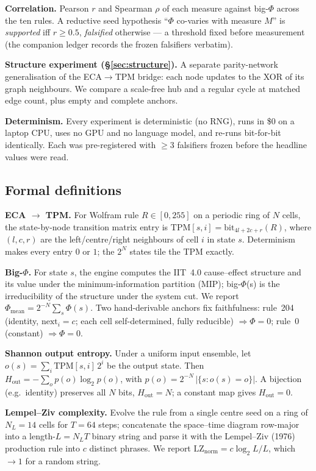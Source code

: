 \documentclass[11pt,a4paper]{article}
\newcommand{\bigphi}{\ensuremath{\Phi}}
\begin{document}
\textbf{Correlation.} Pearson \(r\) and Spearman \(\rho\) of each measure
against big-\bigphi{} across the ten rules. A reductive seed hypothesis
``\bigphi{} co-varies with measure \(M\)'' is \emph{supported} iff
\(r\ge0.5\), \emph{falsified} otherwise --- a threshold fixed before
measurement (the companion ledger records the frozen falsifiers verbatim).

\textbf{Structure experiment (\S\ref{sec:structure}).} A separate
parity-network generalisation of the ECA$\to$TPM bridge: each node
updates to the XOR of its graph neighbours. We compare a scale-free hub
and a regular cycle at matched edge count, plus empty and complete
anchors.

\textbf{Determinism.} Every experiment is deterministic (no RNG), runs in
\$0 on a laptop CPU, uses no GPU and no language model, and re-runs
bit-for-bit identically. Each was pre-registered with \(\ge3\) falsifiers
frozen before the headline values were read.

\subsection{Formal definitions}
\label{sec:formal}

\textbf{ECA \(\to\) TPM.} For Wolfram rule \(R\in[0,255]\) on a periodic
ring of \(N\) cells, the state-by-node transition matrix entry is
\(\mathrm{TPM}[s,i]=\mathrm{bit}_{4l+2c+r}(R)\), where \((l,c,r)\) are the
left/centre/right neighbours of cell \(i\) in state \(s\). Determinism
makes every entry \(0\) or \(1\); the \(2^N\) states tile the TPM exactly.

\textbf{Big-\bigphi{}.} For state \(s\), the engine computes the IIT~4.0
cause--effect structure and its value under the minimum-information
partition (MIP); big-\bigphi{}(s) is the irreducibility of the structure
under the system cut. We report
\(\bigphi_\mathrm{mean}=2^{-N}\sum_{s}\bigphi(s)\). Two hand-derivable
anchors fix faithfulness: rule~204 (identity, \(\mathrm{next}_i=c\); each
cell self-determined, fully reducible) \(\Rightarrow\bigphi=0\); rule~0
(constant) \(\Rightarrow\bigphi=0\).

\textbf{Shannon output entropy.} Under a uniform input ensemble, let
\(o(s)=\sum_i \mathrm{TPM}[s,i]\,2^i\) be the output state. Then
\(H_\mathrm{out}=-\sum_o p(o)\log_2 p(o)\), with \(p(o)=2^{-N}\,
|\{s:o(s)=o\}|\). A bijection (e.g.\ identity) preserves all \(N\) bits,
\(H_\mathrm{out}=N\); a constant map gives \(H_\mathrm{out}=0\).

\textbf{Lempel--Ziv complexity.} Evolve the rule from a single centre seed
on a ring of \(N_L=14\) cells for \(T=64\) steps; concatenate the
space--time diagram row-major into a length-\(L=N_L T\) binary string and
parse it with the Lempel--Ziv (1976) production rule into \(c\) distinct
phrases. We report \(\mathrm{LZ}_\mathrm{norm}=c\log_2 L / L\), which
\(\to 1\) for a random string.
\end{document}
